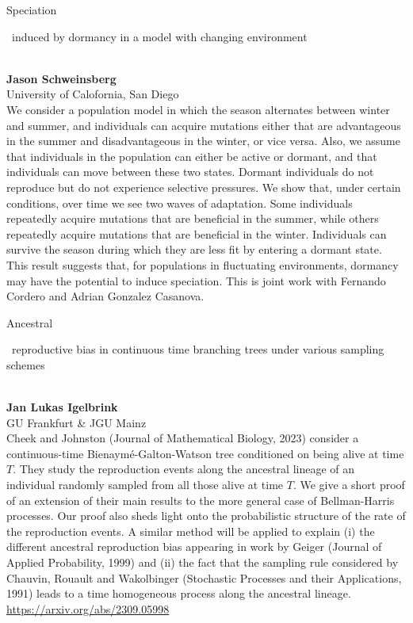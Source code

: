\documentclass[12pt,a4paper]{article}
\newcommand{\ZAbst}{\rule[-1ex]{0pt}{2ex}\ } %
\begin{document}
\bigskip
\bigskip


{\Large  
Speciation\ZAbst induced by dormancy in a model with changing environment}\\[1ex]
{\large 
\textbf{Jason Schweinsberg}\\[1ex] University of Calofornia, San Diego}\\[2ex]
We consider a population model in which the season alternates between winter and summer, and individuals can acquire mutations either that are advantageous in the summer and disadvantageous in the winter, or vice versa.  Also, we assume that individuals in the population can either be active or dormant, and that individuals can move between these two states.  Dormant individuals do not reproduce but do not experience selective pressures.  We show that, under certain conditions, over time we see two waves of adaptation.  Some individuals repeatedly acquire mutations that are beneficial in the summer, while others repeatedly acquire mutations that are beneficial in the winter.   Individuals can survive the season during which they are less fit by entering a dormant state.  This result suggests that, for populations in fluctuating environments, dormancy may have the potential to induce speciation.  This is joint work with Fernando Cordero and Adrian Gonzalez Casanova.

\bigskip \bigskip  %

\noindent
{\Large Ancestral\ZAbst reproductive bias in continuous time branching trees under various sampling schemes}\\[1ex]
{\large 
\textbf{Jan Lukas Igelbrink}\\[1ex] GU Frankfurt \& JGU Mainz}\\[2ex]
Cheek and Johnston (Journal of Mathematical Biology, 2023) consider a continuous-time Bienaymé-Galton-Watson tree conditioned on being alive at time $T$. They study the reproduction events along the ancestral lineage of an individual randomly sampled from all those alive at time $T$. We give a short proof of an extension of their main results to the more general case of Bellman-Harris processes. Our proof also sheds light onto the probabilistic structure of the rate of the reproduction events. A similar method will be applied to explain (i) the different ancestral reproduction bias appearing in work by Geiger (Journal of Applied Probability, 1999) and (ii) the fact that the sampling rule considered by Chauvin, Rouault and Wakolbinger (Stochastic Processes and their Applications, 1991) leads to a time homogeneous process along the ancestral lineage.
\\\url{https://arxiv.org/abs/2309.05998}
\end{document}
